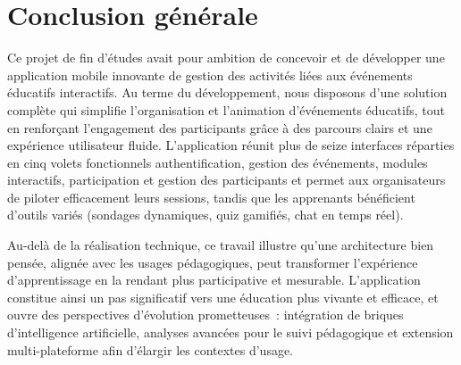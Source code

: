 {}
\section*{Conclusion générale}

Ce projet de fin d’études avait pour ambition de concevoir et de développer une application mobile innovante de gestion des activités liées aux événements éducatifs interactifs. Au terme du développement, nous disposons d’une solution complète qui simplifie l’organisation et l’animation d’événements éducatifs, tout en renforçant l’engagement des participants grâce à des parcours clairs et une expérience utilisateur fluide. L’application réunit plus de  seize interfaces  réparties en cinq volets fonctionnels \textemdash{} authentification, gestion des événements, modules interactifs, participation et gestion des participants \textemdash{} et permet aux organisateurs de piloter efficacement leurs sessions, tandis que les apprenants bénéficient d’outils variés (sondages dynamiques, quiz gamifiés, chat en temps réel).

Au-delà de la réalisation technique, ce travail illustre qu’une architecture bien pensée, alignée avec les usages pédagogiques, peut transformer l’expérience d’apprentissage en la rendant plus participative et mesurable. L’application constitue ainsi un pas significatif vers une éducation plus vivante et efficace, et ouvre des perspectives d’évolution prometteuses~: intégration de briques d’intelligence artificielle, analyses avancées pour le suivi pédagogique et extension multi-plateforme afin d’élargir les contextes d’usage.
